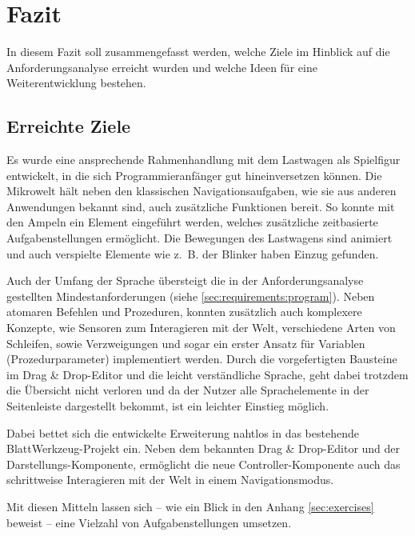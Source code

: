 \chapter{Fazit}
\label{sec:conclusion}

In diesem Fazit soll zusammengefasst werden, welche Ziele im Hinblick auf die Anforderungsanalyse erreicht wurden und welche Ideen für eine Weiterentwicklung bestehen.

\section{Erreichte Ziele}
\label{sec:conclusion:archived}

Es wurde eine ansprechende Rahmenhandlung mit dem Lastwagen als Spielfigur entwickelt, in die sich Programmieranfänger gut hineinversetzen können. Die Mikrowelt hält neben den klassischen Navigationsaufgaben, wie sie aus anderen Anwendungen bekannt sind, auch zusätzliche Funktionen bereit. So konnte mit den Ampeln ein Element eingeführt werden, welches zusätzliche zeitbasierte Aufgabenstellungen ermöglicht. Die Bewegungen des Lastwagens sind animiert und auch verspielte Elemente wie z.~B. der Blinker haben Einzug gefunden.

Auch der Umfang der Sprache übersteigt die in der Anforderungsanalyse gestellten Mindestanforderungen (siehe \ref{sec:requirements:program}). Neben atomaren Befehlen und Prozeduren, konnten zusätzlich auch komplexere Konzepte, wie Sensoren zum Interagieren mit der Welt, verschiedene Arten von Schleifen, sowie Verzweigungen und sogar ein erster Ansatz für Variablen (Prozedurparameter) implementiert werden. Durch die vorgefertigten Bausteine im Drag \& Drop-Editor und die leicht verständliche Sprache, geht dabei trotzdem die Übersicht nicht verloren und da der Nutzer alle Sprachelemente in der Seitenleiste dargestellt bekommt, ist ein leichter Einstieg möglich.

Dabei bettet sich die entwickelte Erweiterung nahtlos in das bestehende BlattWerkzeug-Projekt ein. Neben dem bekannten Drag \& Drop-Editor und der Darstellungs-Komponente, ermöglicht die neue Controller-Komponente auch das schrittweise Interagieren mit der Welt in einem Navigationsmodus.

Mit diesen Mitteln lassen sich -- wie ein Blick in den Anhang \ref{sec:exercises} beweist -- eine Vielzahl von Aufgabenstellungen umsetzen.

